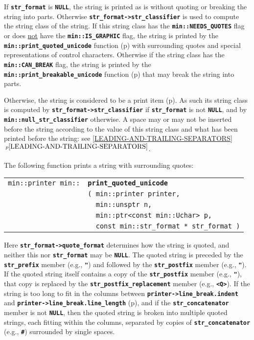 \documentclass[12pt]{article}
\makeatletter
\newcommand{\TT}[1]{{\tt \bfseries #1}}
\newcommand{\ttindex}[1]{\index{#1@{\tt #1}}}
\newcommand{\itemref}[1]{\ref{#1}$\,^{p\pageref{#1}}$}
\newcommand{\pagref}[1]{p\pageref{#1}}
\newcommand{\EOL}{\penalty \exhyphenpenalty}
\newenvironment{indpar}[1][0.3in]%
	{\begin{list}{}%
		     {\setlength{\itemsep}{0in}%
		      \setlength{\topsep}{0in}%
		      \setlength{\parsep}{1ex}%
		      \setlength{\labelwidth}{#1}%
		      \setlength{\leftmargin}{#1}%
		      \addtolength{\leftmargin}{\labelsep}}%
	 \item}%
	{\end{list}}
\newcommand{\LABEL}[1]{\label{#1}}
\newlength{\ARGBREAKLENGTH}
\newcommand{\ARGBREAK}[1][\ARGBREAKLENGTH]{\\&\hspace*{#1}}
\newcommand{\MINKEY}[1]%
	   {\TT{#1}\ttindex{min::#1}\ttindex{#1}}
\makeatother
\begin{document}
If \TT{str\_\EOL format} is \TT{NULL},
the string is printed as is without quoting or breaking the string
into parts.
Otherwise \TT{str\_\EOL format->\EOL str\_\EOL classifier} is used
to compute the string class of the string.  If this string class has the
\TT{min::\EOL NEEDS\_\EOL QUOTES} flag or does \underline{not} have the
\TT{min::\EOL IS\_\EOL GRAPHIC} flag, the string is printed by
the \TT{min::\EOL print\_\EOL quoted\_\EOL unicode} function
(\pagref{MIN::PRINT_QUOTED_UNICODE}) with surrounding quotes
and special representations of control characters.  Otherwise
if the string class has the
\TT{min::\EOL CAN\_\EOL BREAK} flag, the string is printed by
the \TT{min::\EOL print\_\EOL breakable\_\EOL unicode} function
(\pagref{MIN::PRINT_BREAKABLE_UNICODE}) that may break the string
into parts.


Otherwise, the string
is considered to be a print item (\pagref{PRINT-ITEM}).
As such its string class is computed by
\TT{str\_\EOL format->\EOL str\_\EOL classifier} if \TT{str\_\EOL format}
is not \TT{NULL}, and by \TT{min::\EOL null\_\EOL str\_\EOL classifier}
otherwise.
A space may or may not be inserted before the string according to
the value of this string class and what has been printed before the
string: see \itemref{LEADING-AND-TRAILING-SEPARATORS}.

The following function prints a string with surrounding quotes:

\begin{indpar}[1em]\begin{tabular}{r@{}l}
\verb|min::printer min::| & \MINKEY{print\_quoted\_unicode}\ARGBREAK
    \verb|( min::printer printer,|\ARGBREAK
    \verb|  min::unsptr n,|\ARGBREAK
    \verb|  min::ptr<const min::Uchar> p,|\ARGBREAK
    \verb|  const min::str_format * str_format )|
\LABEL{MIN::PRINT_QUOTED_UNICODE} \\
\end{tabular}\end{indpar}


Here \TT{str\_format->quote\_format} determines how the string is quoted,
and neither this nor \TT{str\_\EOL format} may be \TT{NULL}.
The quoted string is preceded
by the \TT{str\_\EOL prefix} member (e.g., \TT{"}) and followed by the
\TT{str\_\EOL postfix} member (e.g., \TT{"}).  If the quoted string itself
contains a copy of the \TT{str\_\EOL postfix} member (e.g., \TT{"}),
that copy is replaced by the \TT{str\_\EOL postfix\_\EOL replacement}
member (e.g., \TT{<Q>}).  If the string is too long to fit in the
columns between \TT{printer->\EOL line\_\EOL break.indent}
and \TT{printer->\EOL line\_\EOL break.line\_\EOL length}
(\pagref{LINE-LENGTH}), and if
the \TT{str\_\EOL concatenator} member is not \TT{NULL}, then
the quoted string is broken into multiple quoted strings, each
fitting within the columns, separated by copies of
\TT{str\_\EOL concatenator} (e.g., \TT{\#})
surrounded by single spaces.
\end{document}
